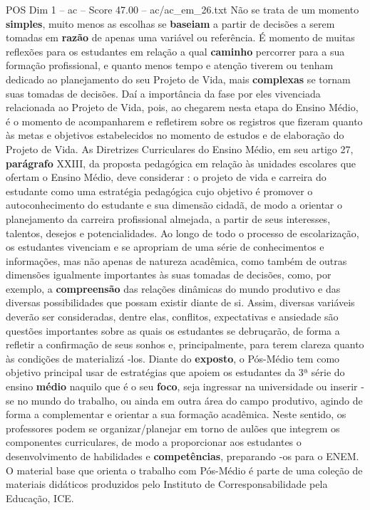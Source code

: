 \begin{textsample}{POS Dim 1 – ac – Score 47.00 – ac/ac\_em\_26.txt}
Não se trata de um momento \textbf{simples}, muito menos as escolhas se \textbf{baseiam} a partir de decisões a serem tomadas em \textbf{razão} de apenas uma variável ou referência.
É momento de muitas reflexões para os estudantes em relação a qual \textbf{caminho} percorrer para a sua formação profissional, e quanto menos tempo e atenção tiverem ou tenham dedicado ao planejamento do seu Projeto de Vida, mais \textbf{complexas} se tornam suas tomadas de decisões.
Daí a importância da fase por eles vivenciada relacionada ao Projeto de Vida, pois, ao chegarem nesta etapa do Ensino Médio, é o momento de acompanharem e refletirem sobre os registros que fizeram quanto às metas e objetivos estabelecidos no momento de estudos e de elaboração do Projeto de Vida.
As Diretrizes Curriculares do Ensino Médio, em seu artigo 27, \textbf{parágrafo} XXIII, da proposta pedagógica em relação às unidades escolares que ofertam o Ensino Médio, deve considerar : o projeto de vida e carreira do estudante como uma estratégia pedagógica cujo objetivo é promover o autoconhecimento do estudante e sua dimensão cidadã, de modo a orientar o planejamento da carreira profissional almejada, a partir de seus interesses, talentos, desejos e potencialidades.
Ao longo de todo o processo de escolarização, os estudantes vivenciam e se apropriam de uma série de conhecimentos e informações, mas não apenas de natureza acadêmica, como também de outras dimensões igualmente importantes às suas tomadas de decisões, como, por exemplo, a \textbf{compreensão} das relações dinâmicas do mundo produtivo e das diversas possibilidades que possam existir diante de si.
Assim, diversas variáveis deverão ser consideradas, dentre elas, conflitos, expectativas e ansiedade são questões importantes sobre as quais os estudantes se debruçarão, de forma a refletir a confirmação de seus sonhos e, principalmente, para terem clareza quanto às condições de materializá -los.
Diante do \textbf{exposto}, o Pós-Médio tem como objetivo principal usar de estratégias que apoiem os estudantes da 3ª série do ensino \textbf{médio} naquilo que é o seu \textbf{foco}, seja ingressar na universidade ou inserir -se no mundo do trabalho, ou ainda em outra área do campo produtivo, agindo de forma a complementar e orientar a sua formação acadêmica.
Neste sentido, os professores podem se organizar/planejar em torno de aulões que integrem os componentes curriculares, de modo a proporcionar aos estudantes o desenvolvimento de habilidades e \textbf{competências}, preparando -os para o ENEM.
O material base que orienta o trabalho com Pós-Médio é parte de uma coleção de materiais didáticos produzidos pelo Instituto de Corresponsabilidade pela Educação, ICE.

\end{textsample}
